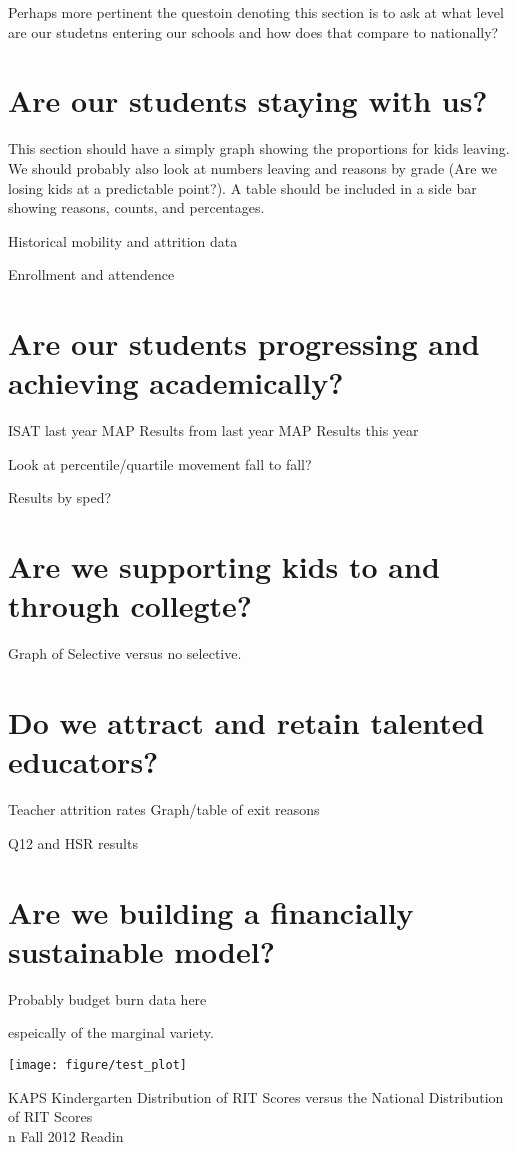 \documentclass[sfsidenotes, justified]{tufte-handout}\usepackage{graphicx, color}
\newenvironment{knitrout}{}{} %
\begin{document}
Perhaps more pertinent the questoin denoting this section is to ask at what level are our studetns entering our schools and how does that compare to nationally?
  
  
\section{Are our students staying with us?}
This section should have a simply graph showing the proportions for kids leaving.  We should probably also look at numbers leaving and reasons by grade (Are we losing kids at a predictable point?).  A table should be included in a side bar showing reasons, counts, and percentages.


Historical mobility and attrition data

Enrollment and attendence

\section{Are our students progressing and achieving academically?}

ISAT last year
MAP Results from last year
MAP Results this year

Look at percentile/quartile movement fall to fall?  

Results by sped?

\section{Are we supporting kids to and through collegte?}

Graph of Selective versus no selective.

\section{Do we attract and retain talented educators?}

Teacher attrition rates
Graph/table of exit reasons

Q12 and HSR results 

\section{Are we building a financially sustainable model?}

Probably budget burn data here

 espeically of the marginal variety. 
\blindtext
\blindtext
\begin{marginfigure}
\begin{knitrout}
\color{fgcolor}

{\centering \texttt{[image: figure/test\_plot]} 

}


\end{knitrout}

\caption{KAPS Kindergarten Distribution of RIT Scores versus the National Distribution of RIT Scores \\n Fall 2012 Readin}
\end{marginfigure}
\blindtext
\blindtext
\end{document}
